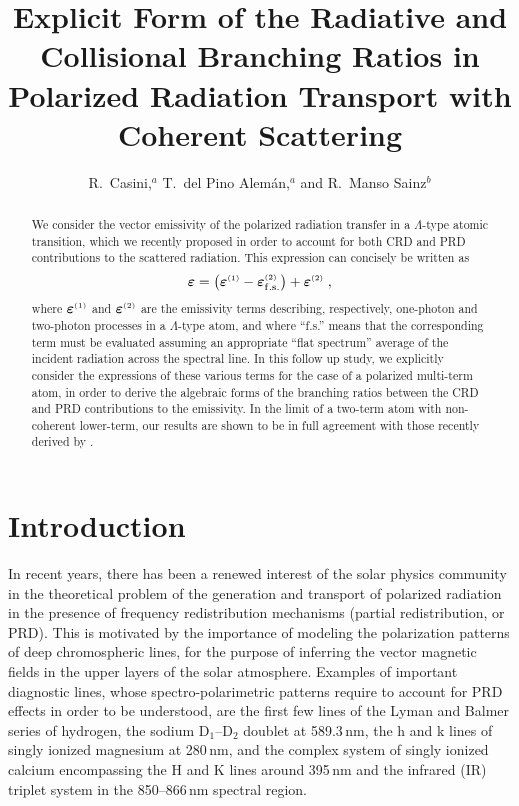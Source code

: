 \documentclass[preprint]{aastex}
\newcommand{\<}{{\kern-5pt}}
\newcommand{\apx}[1]{^{\mbox{\tiny{(#1)}}}}
\begin{document}
\title{Explicit Form of the Radiative and Collisional Branching Ratios\break
in Polarized Radiation Transport with Coherent Scattering}
\author{R.\ Casini,$^a$ T.\ del Pino Alem\'an,$^a$ and R.\ Manso Sainz$^b$}


\begin{abstract}
We consider the vector emissivity of the polarized radiation transfer 
in a $\Lambda$-type atomic transition, which we recently proposed in 
order to account for both CRD and PRD contributions to the
scattered radiation. 
%
This expression can concisely be written as
%
\begin{displaymath}
\bm{\varepsilon}=\left(\bm{\varepsilon}\apx{1}
		      -\bm{\varepsilon}\apx{2}_{\rm f.s.} \right)
	+\bm{\varepsilon}\apx{2}\;,
\end{displaymath}
%
where $\bm{\varepsilon}\apx{1}$ and $\bm{\varepsilon}\apx{2}$ are
the emissivity terms describing, respectively, one-photon and 
two-photon processes in a $\Lambda$-type atom,
and where ``f.s.'' means that the corresponding term
must be evaluated assuming an appropriate ``flat spectrum'' average
of the incident radiation across the spectral line.
%
In this follow up study, we explicitly consider the expressions of 
these various terms for the case of a polarized multi-term atom, 
in order to derive the algebraic forms of the branching ratios 
between the CRD and PRD contributions to the emissivity.
%
In the limit of a two-term atom with non-coherent lower-term, 
our results are shown to be in full agreement with those recently 
derived by \cite{Bo17}.
\end{abstract}

\section{Introduction}

In recent years, there has been a renewed interest of the solar
physics community in the theoretical problem of the generation and
transport of polarized radiation in the presence of frequency 
redistribution mechanisms 
(partial redistribution, or PRD). This is motivated by the importance of 
modeling the polarization patterns of deep chromospheric lines, for the
purpose of inferring the vector magnetic fields in the upper   
layers of the solar atmosphere. Examples of important diagnostic lines,
whose spectro-polarimetric patterns require to account for PRD effects
in order to be understood,
are the first few lines of the Lyman and Balmer series of hydrogen, the 
sodium D$_1$--D$_2$ doublet at 589.3\,nm, the h and k lines of singly ionized 
magnesium at 280\,nm, and the complex system
of singly ionized calcium encompassing the H and K lines around 395\,nm
and the infrared (IR) triplet system in the 850--866\,nm spectral region.
\end{document}
